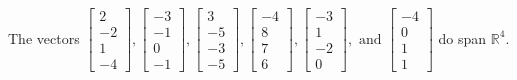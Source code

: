 \begin{exercise}
\begin{exerciseStatement}
  \end{exerciseStatement}
  \begin{exerciseAnswer}
   The vectors \(\left[\begin{array}{r}
2 \\
-2 \\
1 \\
-4
\end{array}\right] , \left[\begin{array}{r}
-3 \\
-1 \\
0 \\
-1
\end{array}\right] , \left[\begin{array}{r}
3 \\
-5 \\
-3 \\
-5
\end{array}\right] , \left[\begin{array}{r}
-4 \\
8 \\
7 \\
6
\end{array}\right] , \left[\begin{array}{r}
-3 \\
1 \\
-2 \\
0
\end{array}\right] , \text{ and } \left[\begin{array}{r}
-4 \\
0 \\
1 \\
1
\end{array}\right]\) 
  	 do  
	span \(\mathbb{R}^4\).
  


  \end{exerciseAnswer}
\end{exercise}
